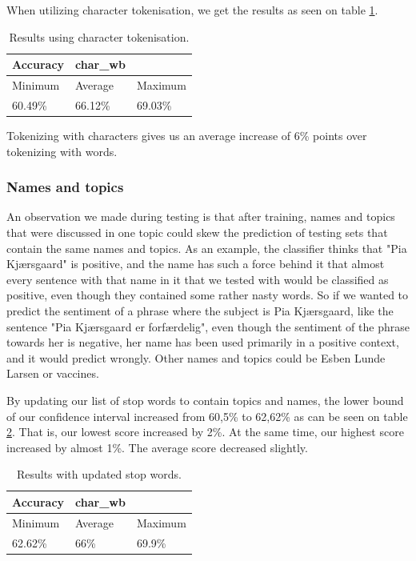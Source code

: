 When utilizing character tokenisation, we get the results as seen on table \ref{chartokenresult}.

\begin{table}[H]
	\begin{tabular}{@{}lll@{}}
		\toprule
		Accuracy & char\_wb &         \\ \midrule
		Minimum  & Average  & Maximum \\
		60.49\%  & 66.12\%  & 69.03\% \\ \bottomrule
	\end{tabular}
	\centering
	\caption{Results using character tokenisation.}
	\label{chartokenresult}
\end{table}

Tokenizing with characters gives us an average increase of 6\% points over tokenizing with words.

\subsubsection{Names and topics}
An observation we made during testing is that after training, names and topics that were discussed in one topic could skew the prediction of testing sets that contain the same names and topics. As an example, the classifier thinks that "Pia Kjærsgaard" is positive, and the name has such a force behind it that almost every sentence with that name in it that we tested with would be classified as positive, even though they contained some rather nasty words. So if we wanted to predict the sentiment of a phrase where the subject is Pia Kjærsgaard, like the sentence "Pia Kjærsgaard er forfærdelig", even though the sentiment of the phrase towards her is negative, her name has been used primarily in a positive context, and it would predict wrongly. Other names and topics could be Esben Lunde Larsen or vaccines.

By updating our list of stop words to contain topics and names, the lower bound of our confidence interval increased from 60,5\% to 62,62\% as can be seen on table \ref{stopwords}. That is, our lowest score increased by 2\%. At the same time, our highest score increased by almost 1\%. The average score decreased slightly. 
\begin{table}[H]
	\begin{tabular}{@{}lll@{}}
		\toprule
		Accuracy & char\_wb &         \\ \midrule
		Minimum  & Average  & Maximum \\
		62.62\%  & 66\%  & 69.9\% \\ \bottomrule
	\end{tabular}
	\centering
	\caption{Results with updated stop words.}
	\label{stopwords}
\end{table}

